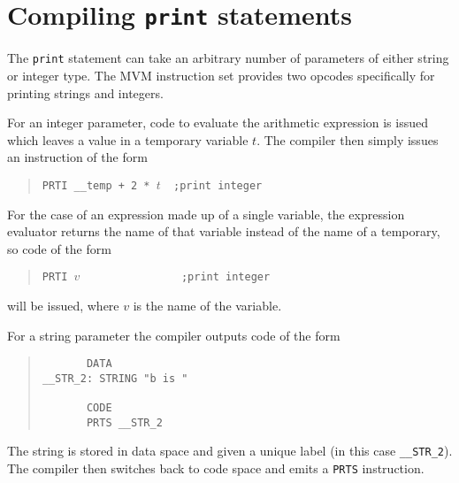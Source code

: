 \section{Compiling {\tt print} statements}
\label{compile:print}
The {\tt print} statement can take an arbitrary number of parameters of either string or
integer type. The MVM instruction set provides two opcodes specifically for printing
strings and integers. 

For an integer parameter, code to evaluate the arithmetic expression is issued which
leaves a value in a temporary variable $t$. The compiler then simply
issues an instruction of the form
\begin{quote}
\verb|PRTI __temp + 2 * |$t$\verb|  ;print integer|
\end{quote}
For the case of an expression made up of a single variable, the expression evaluator returns
the name of that variable instead of the name of a temporary, so code of the form
\begin{quote}
\verb|PRTI |$v$\verb|                ;print integer|
\end{quote}
will be issued, where $v$ is the name of the variable.

For a string parameter the compiler outputs code of the form
\begin{quote}
\small
\begin{verbatim}
       DATA
__STR_2: STRING "b is "

       CODE
       PRTS __STR_2
\end{verbatim}
\end{quote}
The string is stored in data space and given a unique label (in this case \verb+__STR_2+). The compiler
then switches back to code space and emits a {\tt PRTS} instruction.

